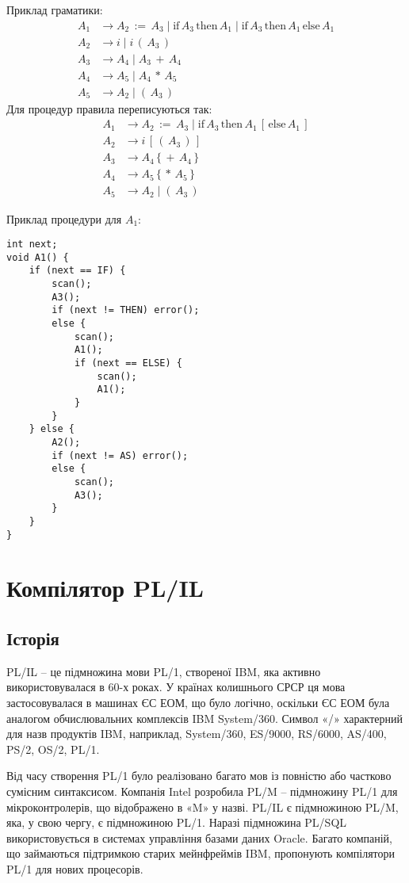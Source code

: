 \documentclass{memoir}
\begin{document}
Приклад граматики:
\begin{align*}
A_1 &\to A_2 \, := \, A_3 \mid \text{if} \, A_3 \, \text{then} \, A_1 \mid \text{if} \, A_3 \, \text{then} \, A_1 \, \text{else} \, A_1 \\
A_2 &\to i \mid i \, ( \, A_3 \, ) \\
A_3 &\to A_4 \mid A_3 \, + \, A_4 \\
A_4 &\to A_5 \mid A_4 \, * \, A_5 \\
A_5 &\to A_2 \mid ( \, A_3 \, )
\end{align*}
Для процедур правила переписуються так:
\begin{align*}
A_1 &\to A_2 \, := \, A_3 \mid \text{if} \, A_3 \, \text{then} \, A_1 \, [ \, \text{else} \, A_1 \, ] \\
A_2 &\to i \, [ \, ( \, A_3 \, ) \, ] \\
A_3 &\to A_4 \, \{ \, + \, A_4 \, \} \\
A_4 &\to A_5 \, \{ \, * \, A_5 \, \} \\
A_5 &\to A_2 \mid ( \, A_3 \, )
\end{align*}

Приклад процедури для \( A_1 \):
\begin{lstlisting}
int next;
void A1() {
    if (next == IF) {
        scan();
        A3();
        if (next != THEN) error();
        else {
            scan();
            A1();
            if (next == ELSE) {
                scan();
                A1();
            }
        }
    } else {
        A2();
        if (next != AS) error();
        else {
            scan();
            A3();
        }
    }
}
\end{lstlisting}

\chapter{Компілятор PL/IL}
\section{Історія}
PL/IL – це підмножина мови PL/1, створеної IBM, яка активно використовувалася в 60-х роках. У країнах колишнього СРСР ця мова застосовувалася в машинах ЄС ЕОМ, що було логічно, оскільки ЄС ЕОМ була аналогом обчислювальних комплексів IBM System/360. Символ «/» характерний для назв продуктів IBM, наприклад, System/360, ES/9000, RS/6000, AS/400, PS/2, OS/2, PL/1.

Від часу створення PL/1 було реалізовано багато мов із повністю або частково сумісним синтаксисом. Компанія Intel розробила PL/M – підмножину PL/1 для мікроконтролерів, що відображено в «M» у назві. PL/IL є підмножиною PL/M, яка, у свою чергу, є підмножиною PL/1. Наразі підмножина PL/SQL використовується в системах управління базами даних Oracle. Багато компаній, що займаються підтримкою старих мейнфреймів IBM, пропонують компілятори PL/1 для нових процесорів.
\end{document}

